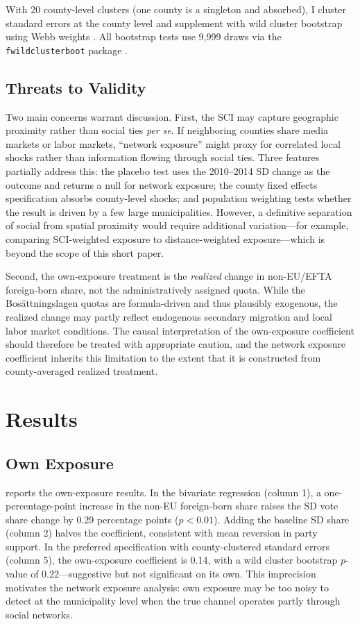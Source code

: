 \documentclass[12pt]{article}
\begin{document}
With 20 county-level clusters (one county is a singleton and absorbed), I cluster standard errors at the county level and supplement with wild cluster bootstrap using Webb weights \citep{cameron2008bootstrap, webb2014reworking}. All bootstrap tests use 9{,}999 draws via the \texttt{fwildclusterboot} package \citep{roodman2019fast}.

\subsection{Threats to Validity}

Two main concerns warrant discussion. First, the SCI may capture geographic proximity rather than social ties \emph{per se}. If neighboring counties share media markets or labor markets, ``network exposure'' might proxy for correlated local shocks rather than information flowing through social ties. Three features partially address this: the placebo test uses the 2010--2014 SD change as the outcome and returns a null for network exposure; the county fixed effects specification absorbs county-level shocks; and population weighting tests whether the result is driven by a few large municipalities. However, a definitive separation of social from spatial proximity would require additional variation---for example, comparing SCI-weighted exposure to distance-weighted exposure---which is beyond the scope of this short paper.

Second, the own-exposure treatment is the \emph{realized} change in non-EU/EFTA foreign-born share, not the administratively assigned quota. While the Bos\"{a}ttningslagen quotas are formula-driven and thus plausibly exogenous, the realized change may partly reflect endogenous secondary migration and local labor market conditions. The causal interpretation of the own-exposure coefficient should therefore be treated with appropriate caution, and the network exposure coefficient inherits this limitation to the extent that it is constructed from county-averaged realized treatment.


\section{Results}

\subsection{Own Exposure}

 reports the own-exposure results. In the bivariate regression (column 1), a one-percentage-point increase in the non-EU foreign-born share raises the SD vote share change by 0.29 percentage points ($p < 0.01$). Adding the baseline SD share (column 2) halves the coefficient, consistent with mean reversion in party support. In the preferred specification with county-clustered standard errors (column 5), the own-exposure coefficient is 0.14, with a wild cluster bootstrap $p$-value of 0.22---suggestive but not significant on its own. This imprecision motivates the network exposure analysis: own exposure may be too noisy to detect at the municipality level when the true channel operates partly through social networks.
\end{document}
